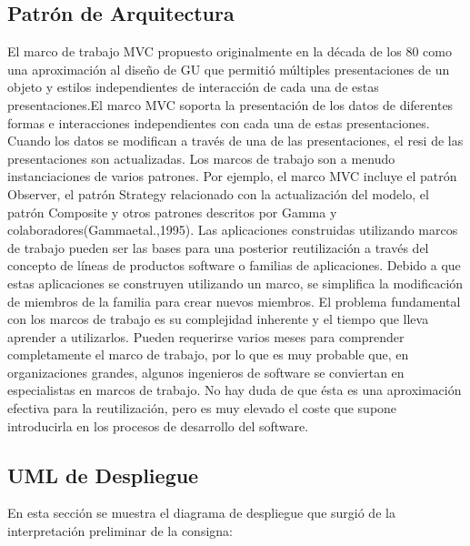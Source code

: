 \documentclass[10pt]{article} %
\begin{document}

\subsection{Patrón de Arquitectura}
El marco de trabajo MVC propuesto originalmente en la década de los 80 como una aproximación al diseño de GU que permitió múltiples presentaciones de un objeto y estilos independientes de interacción de cada una de estas presentaciones.El marco MVC soporta la presentación de los datos de diferentes formas e interacciones independientes con cada una de estas presentaciones. Cuando los datos se modifican a través de una de las presentaciones, el resi de las presentaciones son actualizadas.
Los marcos de trabajo son a menudo instanciaciones de varios patrones. Por ejemplo, el marco MVC incluye el patrón Observer, el patrón Strategy relacionado con la actualización del modelo, el patrón Composite y otros patrones descritos por Gamma y colaboradores(Gammaetal.,1995).
Las aplicaciones construidas utilizando marcos de trabajo pueden ser las bases para una posterior reutilización a través del concepto de líneas de productos software o familias de aplicaciones. Debido a que estas aplicaciones se construyen utilizando un marco, se simplifica la modificación de miembros de la familia para crear nuevos miembros.
El problema fundamental con los marcos de trabajo es su complejidad inherente y el tiempo que lleva aprender a utilizarlos. Pueden requerirse varios meses para comprender completamente el marco de trabajo, por lo que es muy probable que, en organizaciones grandes, algunos ingenieros de software se conviertan en especialistas en marcos de trabajo. No hay duda de que ésta es una aproximación efectiva para la reutilización, pero es muy elevado el coste que supone introducirla en los procesos de desarrollo del software.

\subsection{UML de Despliegue}
En esta sección se muestra el diagrama de despliegue que surgió de la interpretación preliminar de la consigna:
\end{document}
